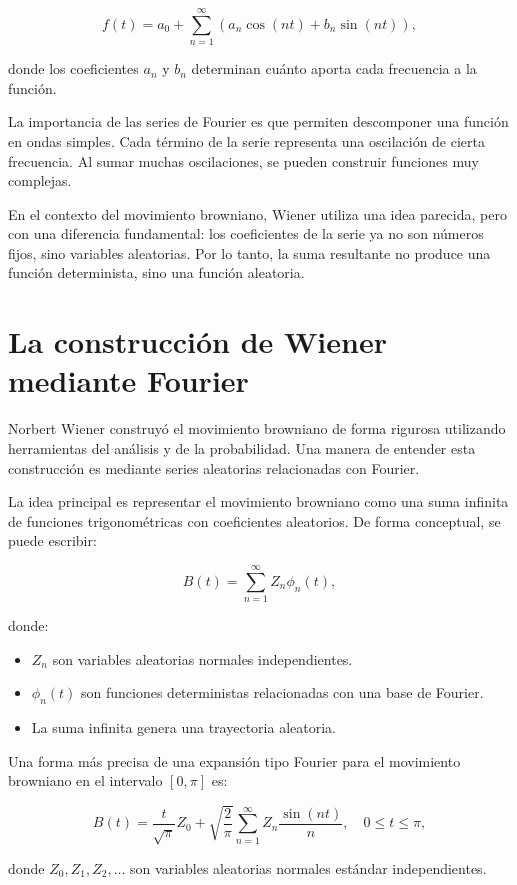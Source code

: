 \documentclass[12pt]{article}
\begin{document}
\[
f(t)=a_0+\sum_{n=1}^{\infty}\left(a_n\cos(nt)+b_n\sin(nt)\right),
\]

donde los coeficientes $a_n$ y $b_n$ determinan cuánto aporta cada frecuencia a la función.

La importancia de las series de Fourier es que permiten descomponer una función en ondas simples. Cada término de la serie representa una oscilación de cierta frecuencia. Al sumar muchas oscilaciones, se pueden construir funciones muy complejas.

En el contexto del movimiento browniano, Wiener utiliza una idea parecida, pero con una diferencia fundamental: los coeficientes de la serie ya no son números fijos, sino variables aleatorias. Por lo tanto, la suma resultante no produce una función determinista, sino una función aleatoria.

\section{La construcción de Wiener mediante Fourier}

Norbert Wiener construyó el movimiento browniano de forma rigurosa utilizando herramientas del análisis y de la probabilidad. Una manera de entender esta construcción es mediante series aleatorias relacionadas con Fourier.

La idea principal es representar el movimiento browniano como una suma infinita de funciones trigonométricas con coeficientes aleatorios. De forma conceptual, se puede escribir:

\[
B(t)=\sum_{n=1}^{\infty} Z_n\phi_n(t),
\]

donde:

\begin{itemize}
    \item $Z_n$ son variables aleatorias normales independientes.
    \item $\phi_n(t)$ son funciones deterministas relacionadas con una base de Fourier.
    \item La suma infinita genera una trayectoria aleatoria.
\end{itemize}

Una forma más precisa de una expansión tipo Fourier para el movimiento browniano en el intervalo $[0,\pi]$ es:

\[
B(t)=\frac{t}{\sqrt{\pi}}Z_0+\sqrt{\frac{2}{\pi}}\sum_{n=1}^{\infty}Z_n\frac{\sin(nt)}{n},
\quad 0\leq t\leq \pi,
\]

donde $Z_0,Z_1,Z_2,\dots$ son variables aleatorias normales estándar independientes.
\end{document}
